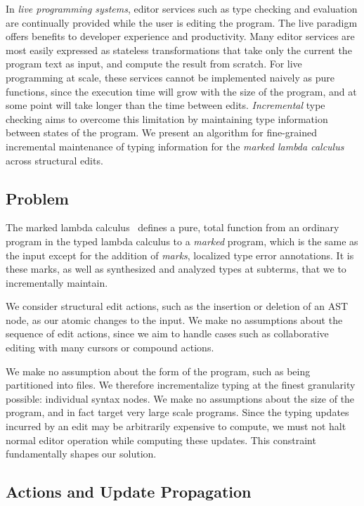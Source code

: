 \documentclass[acmsmall,dvipsnames,10pt,nonacm,sigplan]{acmart}\settopmatter{printfolios=true}
\begin{document}
In \textit{live programming systems}, editor services such as type checking and evaluation are continually provided while the user is editing the program. The live paradigm offers benefits to developer experience and productivity. Many editor services are most easily expressed as stateless transformations that take only the current the program text as input, and compute the result from scratch. For live programming at scale, these services cannot be implemented naively as pure functions, since the execution time will grow with the size of the program, and at some point will take longer than the time between edits. \textit{Incremental} type checking aims to overcome this limitation by maintaining type information between states of the program. We present an algorithm for fine-grained incremental maintenance of typing information for the \textit{marked lambda calculus}~\cite{DBLP:journals/pacmpl/ZhaoMDBPO24} across structural edits.

\subsection*{Problem}

The marked lambda calculus~\cite{DBLP:journals/pacmpl/ZhaoMDBPO24} defines a pure, total function from an ordinary program in the typed lambda calculus to a \textit{marked} program, which is the same as the input except for the addition of \textit{marks}, localized type error annotations. It is these marks, as well as synthesized and analyzed types at subterms, that we to incrementally maintain. 

We consider structural edit actions, such as the insertion or deletion of an AST node, as our atomic changes to the input. We make no assumptions about the sequence of edit actions, since we aim to handle cases such as collaborative editing with many cursors or compound actions. 

We make no assumption about the form of the program, such as being partitioned into files. We therefore incrementalize typing at the finest granularity possible: individual syntax nodes. We make no assumptions about the size of the program, and in fact target very large scale programs. Since the typing updates incurred by an edit may be arbitrarily expensive to compute, we must not halt normal editor operation while computing these updates. This constraint fundamentally shapes our solution. 

\subsection*{Actions and Update Propagation}
\end{document}

